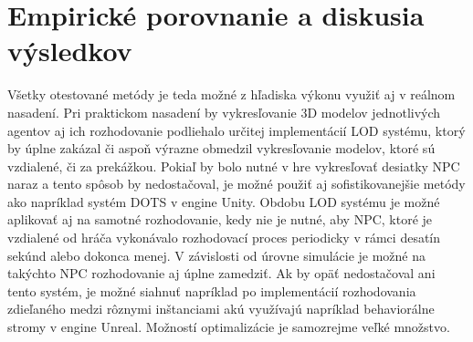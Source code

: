 \documentclass[slovak, master]{diploma}
\begin{document}
\section{Empirické porovnanie a diskusia výsledkov}
\label{sec:Discussion}
Všetky otestované metódy je teda možné z hľadiska výkonu využiť aj v reálnom nasadení. Pri praktickom nasadení by vykresľovanie 3D modelov jednotlivých agentov aj ich rozhodovanie podliehalo určitej implementácií LOD systému, ktorý by úplne zakázal či aspoň výrazne obmedzil vykresľovanie modelov, ktoré sú vzdialené, či za prekážkou. Pokiaľ by bolo nutné v hre vykresľovať desiatky NPC naraz a tento spôsob by nedostačoval, je možné použiť aj sofistikovanejšie metódy ako napríklad systém DOTS v engine Unity. Obdobu LOD systému je možné aplikovať aj na samotné rozhodovanie, kedy nie je nutné, aby NPC, ktoré je vzdialené od hráča vykonávalo rozhodovací proces periodicky v rámci desatín sekúnd alebo dokonca menej. V závislosti od úrovne simulácie je možné na takýchto NPC rozhodovanie aj úplne zamedziť. Ak by opäť nedostačoval ani tento systém, je možné siahnuť napríklad po implementácií rozhodovania zdieľaného medzi rôznymi inštanciami akú využívajú napríklad behaviorálne stromy v engine Unreal. Možností optimalizácie je samozrejme veľké množstvo.
\end{document}
